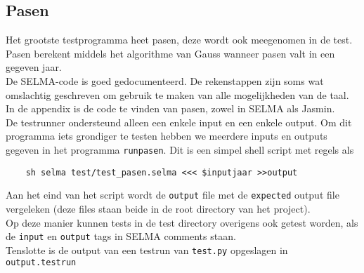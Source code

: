 \documentclass[]{article}
\begin{document}
\subsection{Pasen}
Het grootste testprogramma heet pasen, deze wordt ook meegenomen in de test. Pasen berekent middels het algorithme van Gauss wanneer pasen valt in een gegeven jaar. \\
De SELMA-code is goed gedocumenteerd. De rekenstappen zijn soms wat omslachtig geschreven om gebruik te maken van alle mogelijkheden van de taal.\\
In de appendix is de code te vinden van pasen, zowel in SELMA als Jasmin.\\
De testrunner ondersteund alleen een enkele input en een enkele output. Om dit programma iets grondiger te testen hebben we meerdere inputs en outputs gegeven in het programma \texttt{runpasen}. Dit is een simpel shell script met regels als
\begin{verbatim}
	sh selma test/test_pasen.selma <<< $inputjaar >>output
\end{verbatim}

Aan het eind van het script wordt de \texttt{output} file met de \texttt{expected} output file vergeleken (deze files staan beide in de root directory van het project).\\

Op deze manier kunnen tests in de test directory overigens ook getest worden, als de \texttt{input} en \texttt{output} tags in SELMA comments staan.\\

Tenslotte is de output van een testrun van \texttt{test.py} opgeslagen in \texttt{output.testrun}


\newpage
\end{document}
